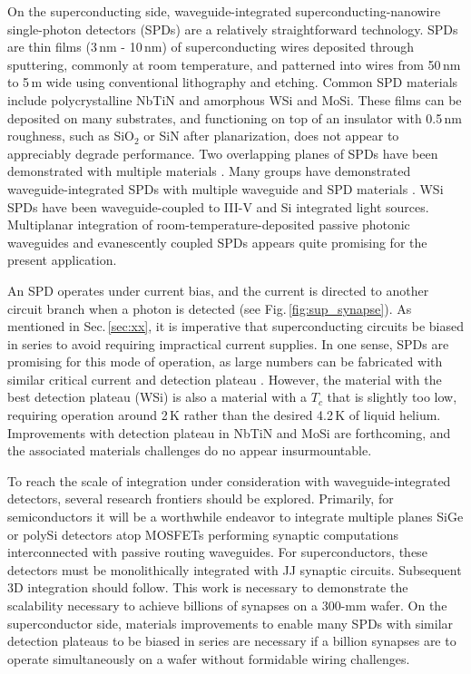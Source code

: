\documentclass[twocolumn]{article}
\begin{document}
On the superconducting side, waveguide-integrated superconducting-nanowire single-photon detectors (SPDs) are a relatively straightforward technology. SPDs are thin films (3\,nm - 10\,nm) of superconducting wires deposited through sputtering, commonly at room temperature, and patterned into wires from 50\,nm to 5\,\textmu m wide using conventional lithography and etching. Common SPD materials include polycrystalline NbTiN and amorphous WSi and MoSi. These films can be deposited on many substrates, and functioning on top of an insulator with 0.5\,nm roughness, such as SiO$_2$ or SiN after planarization, does not appear to appreciably degrade performance. Two overlapping planes of SPDs have been demonstrated with multiple materials \cite{vema2012}. Many groups have demonstrated waveguide-integrated SPDs with multiple waveguide and SPD materials \cite{spga2011,pesc2012,feka2015,saga2015,shbu2017b,buta2020}. WSi SPDs have been waveguide-coupled to III-V and Si integrated light sources. Multiplanar integration of room-temperature-deposited passive photonic waveguides and evanescently coupled SPDs appears quite promising for the present application.

An SPD operates under current bias, and the current is directed to another circuit branch when a photon is detected (see Fig.\,\ref{fig:sup_synapse}). As mentioned in Sec.\,\ref{sec:xx}, it is imperative that superconducting circuits be biased in series to avoid requiring impractical current supplies. In one sense, SPDs are promising for this mode of operation, as large numbers can be fabricated with similar critical current and detection plateau \cite{buta2020}. However, the material with the best detection plateau (WSi) is also a material with a $T_c$ that is slightly too low, requiring operation around 2\,K rather than the desired 4.2\,K of liquid helium. Improvements with detection plateau in NbTiN \cite{zalo2017} and MoSi \cite{} are forthcoming, and the associated materials challenges do no appear insurmountable.
 
To reach the scale of integration under consideration with waveguide-integrated detectors, several research frontiers should be explored. Primarily, for semiconductors it will be a worthwhile endeavor to integrate multiple planes SiGe or polySi detectors atop MOSFETs performing synaptic computations interconnected with passive routing waveguides. For superconductors, these detectors must be monolithically integrated with JJ synaptic circuits. Subsequent 3D integration should follow. This work is necessary to demonstrate the scalability necessary to achieve billions of synapses on a 300-mm wafer. On the superconductor side, materials improvements to enable many SPDs with similar detection plateaus to be biased in series are necessary if a billion synapses are to operate simultaneously on a wafer without formidable wiring challenges. 
\end{document}

